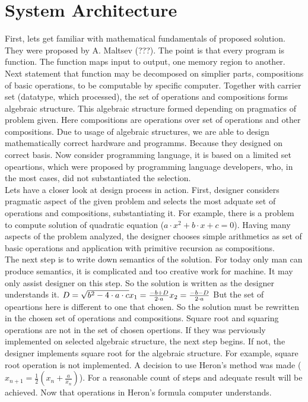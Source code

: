 \section{System Architecture}
First, lets get familiar with mathematical fundamentals of proposed solution. They were proposed by A. Maltsev (???)\cite{}. The point is that every program is function. The function maps input to output, one memory region to another. Next statement that function may be decomposed on simplier parts, compositions of basic operations, to be computable by specific computer. Together with carrier set (datatype, which processed), the set of operations and compositions forms algebraic structure. This algebraic structure formed depending on pragmatics of problem given. Here compositions are operations over set of operations and other compositions. Due to usage of algebraic structures, we are able to design mathematically correct hardware and programms. Because they designed on correct basis. Now consider programming language, it is based on a limited set opeartions, which were proposed by programming language developers, who, in the most cases, did not substantiated the selection.\\
Lets have a closer look at design process in action. First, designer considers pragmatic aspect of the given problem and selects the most adquate set of operations and compositions, substantiating it. For example, there is a problem to compute solution of quadratic equation ($a \cdot x^2 + b \cdot x + c = 0$). Having many aspects of the problem analyzed, the designer chooses simple arithmetics as set of basic operations and application with primitive recursion as compositions.\\
The next step is to write down semantics of the solution. For today only man can produce semantics, it is complicated and too creative work for machine. It may only assist designer on this step. So the solution is written as the designer understands it.
$\\
D = \sqrt{b^{2} - 4 \cdot a \cdot c}\\
x_{1} = \frac{-b + D}{2 \cdot a}\\ 
x_{2} = \frac{-b - D}{2 \cdot a}\\
$
But the set of opeartions here is different to one that chosen. So the solution must be rewritten in the chosen set of operations and compositions. Square root and squaring operations are not in the set of chosen opertions. If they was perviously implemented on selected algebraic structure, the next step begins. If not, the designer implements square root for the algebraic structure. For example, square root operation is not implemented. A decision to use Heron's method  was made ($ x_{n+1} = \frac{1}{2}(x_{n} + \frac{a}{x_{n}}) $). For a reasonable count of steps and adequate result will be achieved. Now that operations in Heron's formula computer understands.\\
